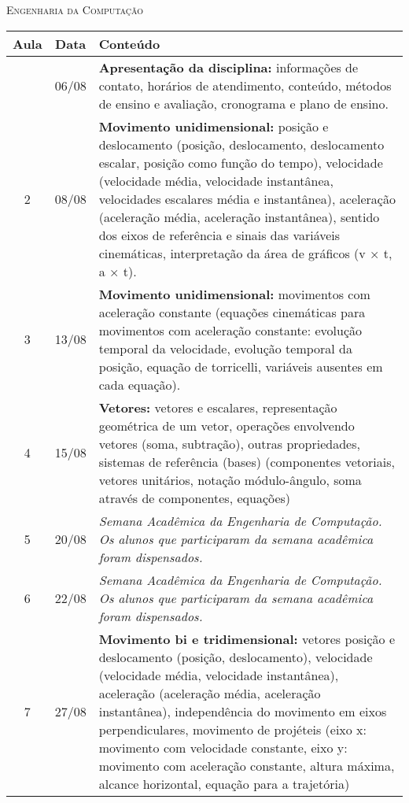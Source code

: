\vspace{1cm}
\begin{center}
\Large\textsc{Engenharia da Computação}
\end{center}
\begin{center}
\begin{longtable}{ccp{70mm}}
\toprule
Aula & Data & Conteúdo \\
\midrule
\endhead
\bottomrule
\endfoot
  1 & 06/08 & \textbf{Apresentação da disciplina:} informações de contato, horários de atendimento, conteúdo, métodos de ensino e avaliação, cronograma e plano de ensino.\\
  2 & 08/08 & \textbf{Movimento unidimensional:} posição e deslocamento (posição, deslocamento, deslocamento escalar, posição como função do tempo), velocidade (velocidade média, velocidade instantânea, velocidades escalares média e instantânea), aceleração (aceleração média, aceleração instantânea), sentido dos eixos de referência e sinais das variáveis cinemáticas, interpretação da área de gráficos (v × t, a × t).\\
  3 & 13/08 & \textbf{Movimento unidimensional:} movimentos com aceleração constante (equações cinemáticas para movimentos com aceleração constante: evolução temporal da velocidade, evolução temporal da posição, equação de torricelli, variáveis ausentes em cada equação).\\
  4 & 15/08 & \textbf{Vetores:} vetores e escalares, representação geométrica de um vetor, operações envolvendo vetores (soma, subtração), outras propriedades, sistemas de referência (bases) (componentes vetoriais, vetores unitários, notação módulo-ângulo, soma através de componentes, equações)\\
  5 & 20/08 & \textit{Semana Acadêmica da Engenharia de Computação. Os alunos que participaram da semana acadêmica foram dispensados.} \\
  6 & 22/08 & \textit{Semana Acadêmica da Engenharia de Computação. Os alunos que participaram da semana acadêmica foram dispensados.} \\
  7 & 27/08 & \textbf{Movimento bi e tridimensional:} vetores posição e deslocamento (posição, deslocamento), velocidade (velocidade média, velocidade instantânea), aceleração (aceleração média, aceleração instantânea), independência do movimento em eixos perpendiculares, movimento de projéteis (eixo x: movimento com velocidade constante, eixo y: movimento com aceleração constante, altura máxima, alcance horizontal, equação para a trajetória)\\

\end{longtable}
\end{center}

